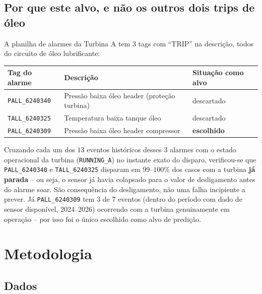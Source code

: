 \documentclass[11pt,a4paper]{article}
\begin{document}
\subsection{Por que este alvo, e não os outros dois trips de óleo}

A planilha de alarmes da Turbina A tem 3 tags com ``TRIP'' na descrição, todos
do circuito de óleo lubrificante:

\begin{center}
\begin{tabular}{lll}
\toprule
Tag do alarme & Descrição & Situação como alvo \\
\midrule
\texttt{PALL\_6240340} & Pressão baixa óleo header (proteção turbina) & descartado \\
\texttt{TALL\_6240325} & Temperatura baixa tanque óleo & descartado \\
\texttt{PALL\_6240309} & Pressão baixa óleo header compressor & \textbf{escolhido} \\
\bottomrule
\end{tabular}
\end{center}

Cruzando cada um dos $13$ eventos históricos desses 3 alarmes com o estado
operacional da turbina (\texttt{RUNNING\_A}) no instante exato do disparo,
verificou-se que \texttt{PALL\_6240340} e \texttt{TALL\_6240325} disparam em
$99$--$100\%$ dos casos com a turbina \textbf{já parada} -- ou seja, o
sensor já havia colapsado para o valor de desligamento antes do alarme
soar. São consequência do desligamento, não uma falha incipiente a prever.
Já \texttt{PALL\_6240309} tem 3 de 7 eventos (dentro do período com dado de
sensor disponível, 2024--2026) ocorrendo com a turbina genuinamente em
operação -- por isso foi o único escolhido como alvo de predição.

\section{Metodologia}

\subsection{Dados}
\end{document}
